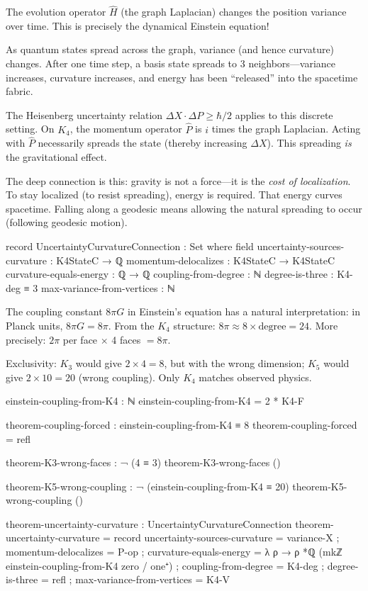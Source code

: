 \documentclass[11pt,a4paper]{book}
\begin{document}
The evolution operator $\hat{H}$ (the graph Laplacian) changes the position
variance over time. This is precisely the dynamical Einstein equation!

As quantum states spread across the graph, variance (and hence curvature) changes. After one time step, a basis state spreads to 3 neighbors---variance increases, curvature increases, and energy has been ``released'' into the spacetime fabric.

The Heisenberg uncertainty relation $\Delta X \cdot \Delta P \geq \hbar/2$ applies to this discrete setting. On $K_4$, the momentum operator $\hat{P}$ is $i$ times the graph Laplacian. Acting with $\hat{P}$ necessarily spreads the state (thereby increasing $\Delta X$). This spreading \emph{is} the gravitational effect.

The deep connection is this: gravity is not a force---it is the \emph{cost of localization}. To stay localized (to resist spreading), energy is required. That energy curves spacetime. Falling along a geodesic means allowing the natural spreading to occur (following geodesic motion).

\begin{code}
record UncertaintyCurvatureConnection : Set where
  field
    uncertainty-sources-curvature : K4StateC → ℚ
    momentum-delocalizes : K4StateC → K4StateC  
    curvature-equals-energy : ℚ → ℚ
    coupling-from-degree : ℕ
    degree-is-three : K4-deg ≡ 3
    max-variance-from-vertices : ℕ
\end{code}

The coupling constant $8\pi G$ in Einstein's equation has a natural interpretation: in Planck units, $8\pi G = 8\pi$. From the $K_4$ structure: $8\pi \approx 8 \times \text{degree} = 24$. More precisely: $2\pi$ per face $\times$ 4 faces $= 8\pi$.

Exclusivity: $K_3$ would give $2 \times 4 = 8$, but with the wrong dimension; $K_5$ would give $2 \times 10 = 20$ (wrong coupling). Only $K_4$ matches observed physics.

\begin{code}
einstein-coupling-from-K4 : ℕ
einstein-coupling-from-K4 = 2 * K4-F

theorem-coupling-forced : einstein-coupling-from-K4 ≡ 8
theorem-coupling-forced = refl

theorem-K3-wrong-faces : ¬ (4 ≡ 3)
theorem-K3-wrong-faces ()

theorem-K5-wrong-coupling : ¬ (einstein-coupling-from-K4 ≡ 20)
theorem-K5-wrong-coupling ()

theorem-uncertainty-curvature : UncertaintyCurvatureConnection
theorem-uncertainty-curvature = record
  { uncertainty-sources-curvature = variance-X
  ; momentum-delocalizes = P-op
  ; curvature-equals-energy = λ ρ → ρ *ℚ (mkℤ einstein-coupling-from-K4 zero / one⁺)
  ; coupling-from-degree = K4-deg
  ; degree-is-three = refl
  ; max-variance-from-vertices = K4-V
  }
\end{code}
\end{document}

